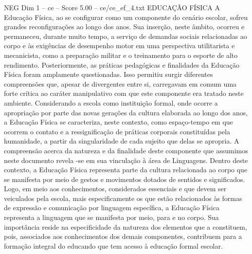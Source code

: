 \begin{textsample}{NEG Dim 1 – ce – Score 5.00 – ce/ce\_ef\_4.txt}  \label{ex:f1_neg_243}
EDUCAÇÃO FÍSICA A Educação Física, ao se configurar como um componente do cenário escolar, sofreu grandes reconfigurações ao longo dos anos.
Sua inserção, neste âmbito, ocorreu e permaneceu, durante muito tempo, a serviço de demandas sociais relacionadas ao corpo e às exigências de desempenho motor em uma perspectiva utilitarista e mecanicista, como a preparação militar e o treinamento para o esporte de alto rendimento.
Posteriormente, as práticas pedagógicas e finalidades da Educação Física foram amplamente questionadas.
Isso permitiu surgir diferentes compreensões que, apesar de divergentes entre si, carregavam em comum uma forte crítica ao caráter manipulativo com que este componente era tratado neste ambiente.
Considerando a escola como instituição formal, onde ocorre a apropriação por parte das novas gerações da cultura elaborada ao longo dos anos, a Educação Física se caracteriza, neste contexto, como espaço-tempo em que ocorrem o contato e a ressignificação de práticas corporais constituídas pela humanidade, a partir da singularidade de cada sujeito que delas se apropria.
A compreensão acerca da natureza e da finalidade deste componente que assumimos neste documento revela -se em sua vinculação à área de Linguagens.
Dentro deste contexto, a Educação Física representa parte da cultura relacionada ao corpo que se manifesta por meio de gestos e movimentos dotados de sentidos e significados.
Logo, em meio aos conhecimentos, considerados essenciais e que devem ser veiculados pela escola, mais especificamente os que estão relacionados às formas de expressão e comunicação por linguagem específica, a Educação Física representa a linguagem que se manifesta por meio, para e no corpo.
Sua importância reside na especificidade da natureza dos elementos que a constituem, pois, associados aos conhecimentos dos demais componentes, contribuem para a formação integral do educando que tem acesso à educação formal escolar.

\end{textsample}
